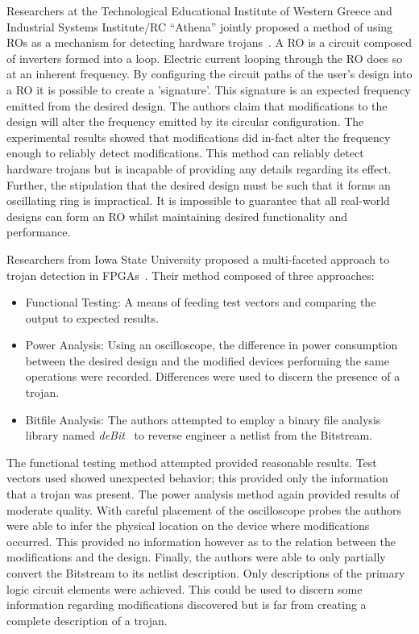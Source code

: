 \documentclass[conference]{IEEEtran}
\begin{document}
Researchers at the Technological Educational Institute of Western Greece and Industrial Systems Institute/RC “Athena” jointly proposed a method of using \acrfull{ROs} as a mechanism for detecting hardware trojans~\cite{ringOscillatorMethod}.
A \acrshort{RO} is a circuit composed of inverters formed into a loop.
Electric current looping through the \acrshort{RO} does so at an inherent frequency.
By configuring the circuit paths of the user's design into a \acrshort{RO} it is possible to create a 'signature'.
This signature is an expected frequency emitted from the desired design. 
The authors claim that modifications to the design will alter the frequency emitted by its circular configuration.
The experimental results showed that modifications did in-fact alter the frequency enough to reliably detect modifications.
This method can reliably detect hardware trojans but is incapable of providing any details regarding its effect.
Further, the stipulation that the desired design must be such that it forms an oscillating ring is impractical.
It is impossible to guarantee that all real-world designs can form an \acrshort{RO} whilst maintaining desired functionality and performance.

Researchers from Iowa State University proposed a multi-faceted approach to trojan detection in \acrshort{FPGA}s~\cite{multiFacetedApproach}.
Their method composed of three approaches:
\begin{itemize}
	\item Functional Testing: A means of feeding test vectors and comparing the output to expected results.
	\item Power Analysis: Using an oscilloscope, the difference in power consumption between the desired design and the modified devices performing the same operations were recorded. Differences were used to discern the presence of a trojan.
	\item Bitfile Analysis: The authors attempted to employ a binary file analysis library named \textit{deBit}~\cite{bitStreamToNetlist} to reverse engineer a netlist from the \gls{Bitstream}.
\end{itemize}
The functional testing method attempted provided reasonable results. 
Test vectors used showed unexpected behavior; this provided only the information that a trojan was present.
The power analysis method again provided results of moderate quality.
With careful placement of the oscilloscope probes the authors were able to infer the physical location on the device where modifications occurred.
This provided no information however as to the relation between the modifications and the design.
Finally, the authors were able to only partially convert the \gls{Bitstream} to its netlist description.
Only descriptions of the primary logic circuit elements were achieved.
This could be used to discern some information regarding modifications discovered but is far from creating a complete description of a trojan.
\end{document}
